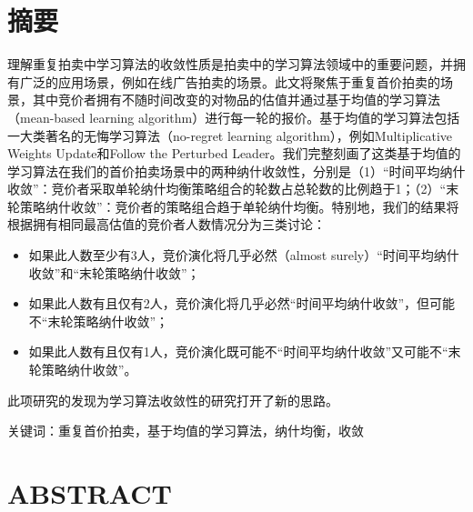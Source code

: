 \chapter*{\bfseries 摘要}

理解重复拍卖中学习算法的收敛性质是拍卖中的学习算法领域中的重要问题，并拥有广泛的应用场景，例如在线广告拍卖的场景。此文将聚焦于重复首价拍卖的场景，其中竞价者拥有不随时间改变的对物品的估值并通过基于均值的学习算法（mean-based learning algorithm）进行每一轮的报价。基于均值的学习算法包括一大类著名的无悔学习算法（no-regret learning algorithm），例如Multiplicative Weights Update和Follow the Perturbed Leader。我们完整刻画了这类基于均值的学习算法在我们的首价拍卖场景中的两种纳什收敛性，分别是（1）“时间平均纳什收敛”：竞价者采取单轮纳什均衡策略组合的轮数占总轮数的比例趋于1；（2）“末轮策略纳什收敛”：竞价者的策略组合趋于单轮纳什均衡。特别地，我们的结果将根据拥有相同最高估值的竞价者人数情况分为三类讨论：
\begin{itemize}
    \item 如果此人数至少有3人，竞价演化将几乎必然（almost surely）“时间平均纳什收敛”和“末轮策略纳什收敛”；
    \item 如果此人数有且仅有2人，竞价演化将几乎必然“时间平均纳什收敛”，但可能不“末轮策略纳什收敛”；
    \item 如果此人数有且仅有1人，竞价演化既可能不“时间平均纳什收敛”又可能不“末轮策略纳什收敛”。
\end{itemize}
此项研究的发现为学习算法收敛性的研究打开了新的思路。


\bigskip
\bigskip

关键词：重复首价拍卖，基于均值的学习算法，纳什均衡，收敛

\chapter*{\bfseries ABSTRACT}


